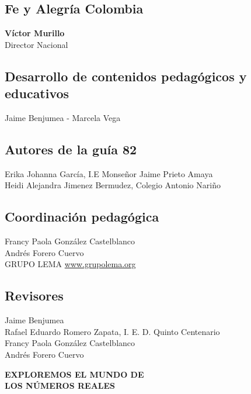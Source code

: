 \documentclass[12pt,a4paper]{article}
\begin{document}
\subsection*{Fe y Alegría Colombia}
\textbf{Víctor Murillo}\\
Director Nacional

\subsection*{Desarrollo de contenidos pedagógicos y educativos}
Jaime Benjumea - Marcela Vega

\subsection*{Autores de la guía 82}
Erika Johanna García, I.E Monseñor Jaime Prieto Amaya\\
Heidi Alejandra Jimenez Bermudez, Colegio Antonio Nariño

\subsection*{Coordinación pedagógica}
Francy Paola González Castelblanco\\
Andrés Forero Cuervo\\
GRUPO LEMA \url{www.grupolema.org}

\subsection*{Revisores}
Jaime Benjumea\\
Rafael Eduardo Romero Zapata, I. E. D. Quinto Centenario\\
Francy Paola González Castelblanco\\
Andrés Forero Cuervo


\begin{center}
\end{center}

\vspace{0.5cm}

\begin{center}
    {\Large\textbf{EXPLOREMOS EL MUNDO DE\\LOS NÚMEROS REALES}}
\end{center}
\end{document}

